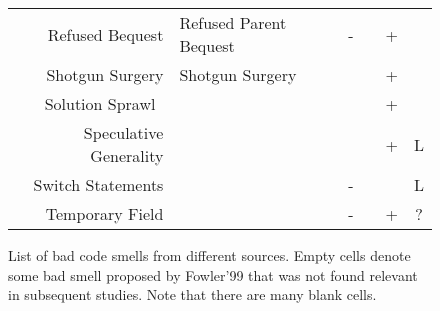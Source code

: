 \begin{figure*}[!t]
\begin{tabular}{r|l|c|c|c|c}
  Refused Bequest & Refused Parent Bequest & - & & + & \\ 
  Shotgun Surgery & Shotgun Surgery & & & + & \\
  Solution Sprawl~\cite{Kerievsky2004} & & & & + &\\
  Speculative Generality & & & & + & L\\
  Switch Statements &  & - & & & L\\
  Temporary Field & & - & & + & ?\\
  \end{tabular}

\caption{List of bad code smells from different sources. Empty cells
denote some bad smell proposed by Fowler'99 that was not found relevant
in subsequent studies. Note that there are many blank cells.}
\label{fig:smells}
\end{figure*}